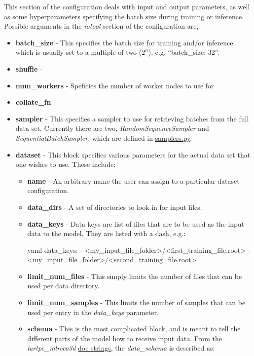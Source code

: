 \documentclass[8pt]{refart}
\begin{document}
This section of the configuration deals with input and output parameters, as well as some hyperparameters specifying the batch size during training or inference.  Possible arguments in the \textit{iotool} section of the configuration are,
\begin{itemize}
    \item \textbf{batch\_size} - This specifies the batch size for training and/or inference which is usually set to a multiple of two ($2^n$), e.g. ``batch\_size: 32''.
    \item \textbf{shuffle} - 
    \item \textbf{num\_workers} - Speficies the number of worker nodes to use for 
    \item \textbf{collate\_fn} - 
    \item \textbf{sampler} - This specifies a sampler to use for retrieving batches from the full data set.  Currently there are two, \textit{RandomSequenceSampler} and \textit{SequentialBatchSampler}, which are defined in \href{https://github.com/DeepLearnPhysics/lartpc_mlreco3d/blob/develop/mlreco/iotools/samplers.py}{samplers.py}.
    \item \textbf{dataset} - This block specifies various parameters for the actual data set that one wishes to use.  These include:
    \begin{itemize}
        \item \textbf{name} - An arbitrary name the user can assign to a particular dataset configuration.
        \item \textbf{data\_dirs} - A set of directories to look in for input files.
        \item {}\textbf{data\_keys} - Data keys are list of files that are to be used as the input data to the model.  They are listed with a dash, e.g.:
        \begin{code}{yaml}
        data_keys:
         - <my_input_file_folder>/<first_training_file.root>
         - <my_input_file_folder>/<second_training_file.root>
        \end{code}
        \item \textbf{limit\_num\_files} - This simply limits the number of files that can be used per data directory.
        \item \textbf{limit\_num\_samples} - This limits the number of samples that can be used per entry in the \textit{data\_keys} parameter.
        \item \textbf{schema} - This is the most complicated block, and is meant to tell the different parts of the model how to receive input data.  From the \textit{lartpc\_mlreco3d} \href{https://github.com/DeepLearnPhysics/lartpc_mlreco3d/blob/develop/mlreco/iotools/datasets.py}{doc strings}, the \textit{data\_schema} is described as:

\end{itemize}
\end{itemize}
\end{document}
